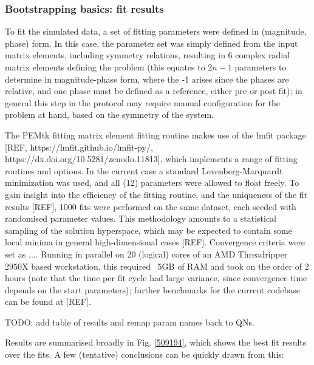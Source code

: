 \subsubsection{Bootstrapping basics: fit results}

To fit the simulated data, a set of fitting parameters were defined in (magnitude, phase) form. In this case, the parameter set was simply defined from the input matrix elements, including symmetry relations, resulting in 6 complex radial matrix elements defining the problem (this equates to $2n-1$ parameters to determine in magnitude-phase form, where the -1 arises since the phases are relative, and one phase must be defined as a reference, either pre or post fit); in general this step in the protocol may require manual configuration for the problem at hand, based on the symmetry of the system. 

The PEMtk fitting matrix element fitting routine makes use of the lmfit package [REF, https://lmfit.github.io/lmfit-py/, https://dx.doi.org/10.5281/zenodo.11813], which implements a range of fitting routines and options. In the current case a standard Levenberg-Marquardt minimization was used, and all (12) parameters were allowed to float freely. To gain insight into the efficiency of the fitting routine, and the uniqueness of the fit results [REF], 1000 fits were performed on the same dataset, each seeded with randomised parameter values. This methodology amounts to a statistical sampling of the solution hyperspace, which may be expected to contain some local minima in general high-dimensional cases [REF]. Convergence criteria were set as .... Running in parallel on 20 (logical) cores of an AMD Threadripper 2950X based workstation, this required ~5GB of RAM and took on the order of 2 hours (note that the time per fit cycle had large variance, since convergence time depends on the start parameters); further benchmarks for the current codebase can be found at [REF].

TODO: add table of results and remap param names back to QNs.

Results are summarised broadly in Fig. \ref{509194}, which shows the best fit results over the fits. A few (tentative) conclusions can be quickly drawn from this:


